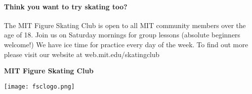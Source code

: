 \documentclass[12pt]{article}
\newcommand{\programnumber}[3]{{
  \vspace{0.2in}
  \textbf{#1}\\
  {\footnotesize #2 \textit{#3}}
}}
\begin{document}
\begin{multicols*}{2}


\paragraph{Think you want to try skating too?} The MIT Figure Skating Club is open to all MIT community members over the age of 18. Join us on Saturday mornings for group lessons (absolute beginners welcome!) We have ice time for practice every day of the week. To find out more please visit our website at web.mit.edu/skatingclub

\vfill\null
\columnbreak


\begin{center}

\vspace*{1.5in}

\begin{Large}
{\bfseries
MIT Figure Skating Club
}
\end{Large}

\vspace{0.2in}

\begin{large}
{\bfseries
}
\end{large}

\vspace{0.7in}

\texttt{[image: fsclogo.png]}

\end{center}

\vfill\null
\columnbreak



\begin{center}



\end{center}
\end{multicols*}
\end{document}
